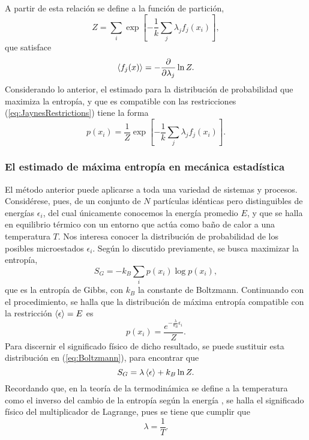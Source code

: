 A partir de esta relación se define a la función de partición,
\begin{equation*}
    Z=\sum_{i}\exp[-\frac{1}{k}\sum_{j}\lambda_{j}f_{j}(x_{i})],
\end{equation*}
que satisface
\begin{equation*}
    \expval{f_{j}(x)}=-\frac{\partial}{\partial \lambda_{j}}\ln{Z}.
\end{equation*}
Considerando lo anterior, el estimado para la distribución de probabilidad que maximiza la entropía, y que es compatible con las restricciones (\ref{eq:JaynesRestrictions}) tiene la forma 
\begin{equation}\label{eq:MaxEntDist}
    p(x_{i})=\frac{1}{Z}\exp[-\frac{1}{k}\sum_{j}\lambda_{j}f_{j}(x_{i})].
\end{equation}

\subsubsection{El estimado de máxima entropía en mecánica estadística}

El método anterior puede aplicarse a toda una variedad de sistemas y procesos. Considérese, pues, de un conjunto de $N$ partículas idénticas pero distinguibles de energías $\epsilon_{i}$, del cual únicamente conocemos la energía promedio $E$, y que se halla en equilibrio térmico con un entorno que actúa como baño de calor a una temperatura $T$. Nos interesa conocer la distribución de probabilidad de los posibles microestados $\epsilon_{i}$. Según lo discutido previamente, se busca maximizar la entropía,
\begin{equation}\label{eq:GibbsEntropy}
    S_{G}=-k_{B}\sum_{i}p(x_{i})\log{p(x_{i})},
\end{equation}
que es la entropía de Gibbs, con $k_{B}$ la constante de Boltzmann. Continuando con el procedimiento, se halla que la distribución de máxima entropía compatible con la restricción $\expval{\epsilon}=E$ es
\begin{equation}\label{eq:Boltzmann}
    p(x_{i})=\frac{e^{-\frac{\lambda}{k_{B}}\epsilon_{i}}}{Z}.
\end{equation}
Para discernir el significado físico de dicho resultado, se puede sustituir esta distribución en (\ref{eq:Boltzmann}), para encontrar que
\begin{equation}
    S_{G}=\lambda\expval{\epsilon}+k_{B}\ln{Z}.
\end{equation}
Recordando que, en la teoría de la termodinámica  se define a la temperatura como el inverso del cambio de la entropía según la energía \cite{Greiner}, se halla el significado físico del multiplicador de Lagrange, pues se tiene que cumplir que
\begin{equation*}
    \lambda=\frac{1}{T}.
\end{equation*}

